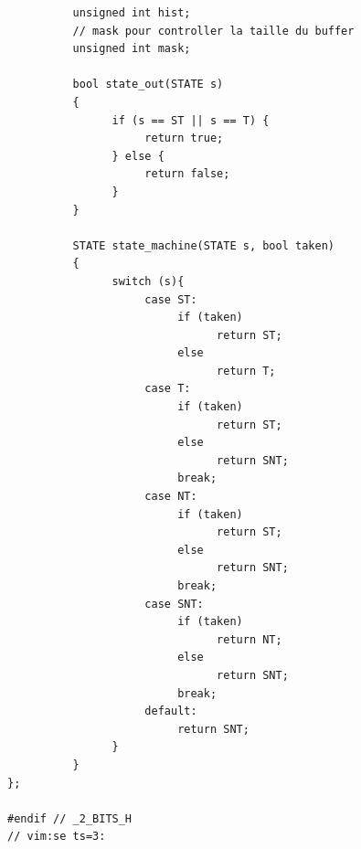 \documentclass[a4paper]{article}
\begin{document}
\begin{verbatim}
		  unsigned int hist;
		  // mask pour controller la taille du buffer
		  unsigned int mask;

		  bool state_out(STATE s)
		  {
				if (s == ST || s == T) {
					 return true;
				} else {
					 return false;
				}
		  }

		  STATE state_machine(STATE s, bool taken)
		  {
				switch (s){
					 case ST:
						  if (taken)
								return ST;
						  else
								return T;
					 case T:
						  if (taken)
								return ST;
						  else
								return SNT;
						  break;
					 case NT:
						  if (taken)
								return ST;
						  else
								return SNT;
						  break;
					 case SNT:
						  if (taken)
								return NT;
						  else
								return SNT;
						  break;
					 default:
						  return SNT;
				}
		  }
};

#endif // _2_BITS_H
// vim:se ts=3:
\end{verbatim}
\normalsize
\end{document}
